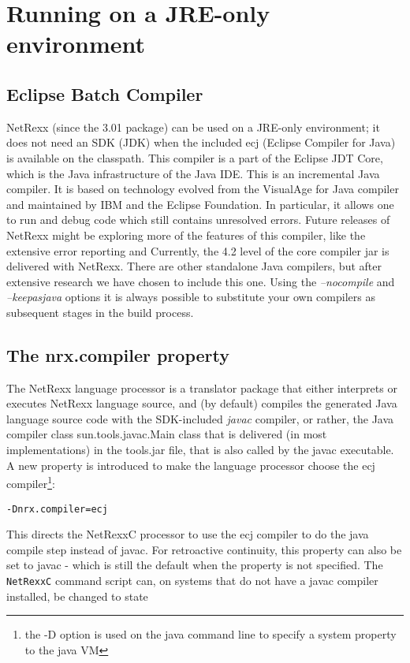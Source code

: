 \chapter{Running on a JRE-only environment\label{nosdk}}
 
\section{Eclipse Batch Compiler}
NetRexx (since the 3.01 package) can be used on a JRE-only environment; it does not need an SDK (JDK) when the included ecj (Eclipse Compiler for Java) is available on the classpath. This compiler is a part of the Eclipse JDT Core, which is the Java infrastructure of the Java IDE. This is an incremental Java compiler. It is based on technology evolved from the VisualAge for Java compiler and maintained by IBM and the Eclipse Foundation. In particular, it allows one to run and debug code which still contains unresolved errors. Future releases of NetRexx might be exploring more of the features of this compiler, like the extensive error reporting and  Currently, the 4.2 level of the core compiler jar is delivered with NetRexx. There are other standalone Java compilers, but after extensive research we have chosen to include this one. Using the \emph{–nocompile} and \emph{–keepasjava} options it is always possible to substitute your own compilers as subsequent stages in the build process.
 
\section{The nrx.compiler property}
The NetRexx language processor is a translator package that either interprets or executes NetRexx language source, and (by default) compiles the generated Java language source code with the SDK-included \emph{javac} compiler, or rather, the Java compiler class sun.tools.javac.Main class that is delivered (in most implementations) in the tools.jar file, that is also called by the javac executable. A new property is introduced to make the language processor choose the ecj compiler\footnote{the -D option is used on the java command line to specify a system property to the java VM}:
 
\begin{verbatim}
-Dnrx.compiler=ecj
\end{verbatim}
 
This directs the NetRexxC processor to use the ecj compiler to do the java compile step instead of javac. For retroactive continuity, this property can also be set to javac - which is still the default when the property is not specified. The \texttt{NetRexxC} command script can, on systems that do not have a javac compiler installed, be changed to state
 
